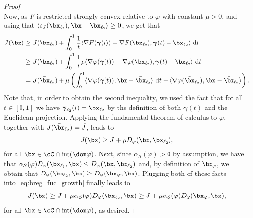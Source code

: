 \documentclass[11pt]{amsart}
\begin{document}
\begin{proof}
$$$$
Now, as $F$ is restricted strongly convex relative to $\varphi$ with constant $\mu>0$, and using that $\langle s_J(\bar\bx_{\ell_2}), \bx-\bar\bx_{\ell_2}\rangle\geq 0$, we get that
$$
\begin{aligned}
J(\bx)
&\geq J(\bar\bx_{\ell_2})+\int_0^1 \frac{1}{t} \langle \nabla F(\boldsymbol{\gamma}(t))-\nabla F(\bar\bx_{\ell_2}),\boldsymbol{\gamma}(t)-\bar\bx_{\ell_2}\rangle \ \mathrm{d}t\\
&\geq J(\bar\bx_{\ell_2})+\int_0^1 \frac{1}{t}\mu \langle \nabla \varphi(\boldsymbol{\gamma}(t))-\nabla\varphi(\bar\bx_{\ell_2}),\boldsymbol{\gamma}(t)-\bar\bx_{\ell_2}\rangle \ \mathrm{d}t\\
&=J(\bar\bx_{\ell_2})+\mu\left(\int_0^1 \langle \nabla \varphi(\boldsymbol{\gamma}(t)), \bx-\bar\bx_{\ell_2} \rangle \ \mathrm{d}t - \langle \nabla \varphi(\bar\bx_{\ell_2}), \bx-\bar\bx_{\ell_2}\rangle\right).
\end{aligned}
$$
Note that, in order to obtain the second inequality, we used the fact that for all $t \in [0,1]$ we have 
$\overline{\boldsymbol{\gamma}}_{\ell_2}(t) = \bar{\bx}_{\ell_2}$ 
by the definition of both $\boldsymbol{\gamma}(t)$ and the Euclidean projection. Applying the fundamental theorem of calculus to $\varphi$, together with $J(\bar\bx_{\ell_2})=\bar J$, leads to
\begin{equation}\label{eq:breg_fuc_growth}
J(\bx)\geq \bar J+\mu D_{\varphi}(\bx,\bar\bx_{\ell_2}),
\end{equation}
for all $\bx\in\cC\cap \mathrm{int}(\dom \varphi)$. Next, since $\alpha_\mathcal{S}(\varphi)>0$ by assumption, we have that $\alpha_\mathcal{S}(\varphi)D_{\varphi}(\bar\bx_{\ell_2},\bx)\leq D_{\varphi}(\bx,\bar\bx_{\ell_2})$ and, by definition of $\bar\bx_{\varphi}$, we obtain that $D_{\varphi}(\bar\bx_{\ell_2},\bx)\geq D_{\varphi}(\bar\bx_{\varphi},\bx)$. Plugging both of these facts into~\cref{eq:breg_fuc_growth} finally leads to
$$
J(\bx)\geq \bar J+\mu\alpha_\mathcal{S}(\varphi) D_{\varphi}(\bar\bx_{\ell_2},\bx)\geq \bar J+\mu\alpha_\mathcal{S}(\varphi) D_{\varphi}(\bar\bx_{\varphi},\bx),
$$
for all $\bx\in\cC\cap \mathrm{int}(\dom \varphi)$, as desired.
\end{proof}
\end{document}
